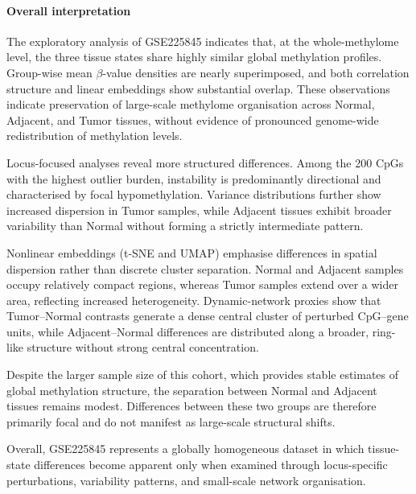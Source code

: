 \paragraph{Overall interpretation}

The exploratory analysis of GSE225845 indicates that, at the whole-methylome level,
the three tissue states share highly similar global methylation profiles.
Group-wise mean $\beta$-value densities are nearly superimposed,
and both correlation structure and linear embeddings show substantial overlap.
These observations indicate preservation of large-scale methylome organisation
across Normal, Adjacent, and Tumor tissues, without evidence of pronounced
genome-wide redistribution of methylation levels.

Locus-focused analyses reveal more structured differences.
Among the 200 CpGs with the highest outlier burden,
instability is predominantly directional and characterised by focal hypomethylation.
Variance distributions further show increased dispersion in Tumor samples,
while Adjacent tissues exhibit broader variability than Normal
without forming a strictly intermediate pattern.

Nonlinear embeddings (t-SNE and UMAP) emphasise differences in spatial dispersion
rather than discrete cluster separation.
Normal and Adjacent samples occupy relatively compact regions,
whereas Tumor samples extend over a wider area,
reflecting increased heterogeneity.
Dynamic-network proxies show that Tumor–Normal contrasts
generate a dense central cluster of perturbed CpG–gene units,
while Adjacent–Normal differences are distributed along a broader,
ring-like structure without strong central concentration.

Despite the larger sample size of this cohort,
which provides stable estimates of global methylation structure,
the separation between Normal and Adjacent tissues remains modest.
Differences between these two groups are therefore primarily focal
and do not manifest as large-scale structural shifts.

Overall, GSE225845 represents a globally homogeneous dataset
in which tissue-state differences become apparent only when examined
through locus-specific perturbations, variability patterns,
and small-scale network organisation.



